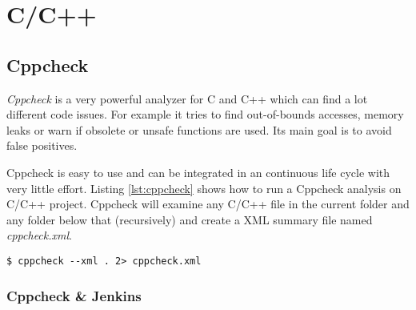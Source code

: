 \section{C/C++}

\subsection{Cppcheck}
\textit{Cppcheck} is a very powerful analyzer for C and C++ which can find a lot different code issues. For example it tries to find out-of-bounds accesses, memory leaks or warn if obsolete or unsafe functions are used. Its main goal is to avoid false positives.

Cppcheck is easy to use and can be integrated in an continuous life cycle with very little effort.
Listing \ref{lst:cppcheck} shows how to run a Cppcheck analysis on C/C++ project. Cppcheck will examine any C/C++ file in the current folder and any folder below that (recursively) and create a XML summary file named \textit{cppcheck.xml}.

\begin{lstlisting}[caption={Bash command to run Cppcheck},label={lst:cppcheck}]
$ cppcheck --xml . 2> cppcheck.xml
\end{lstlisting}


\subsubsection{Cppcheck \& Jenkins}

